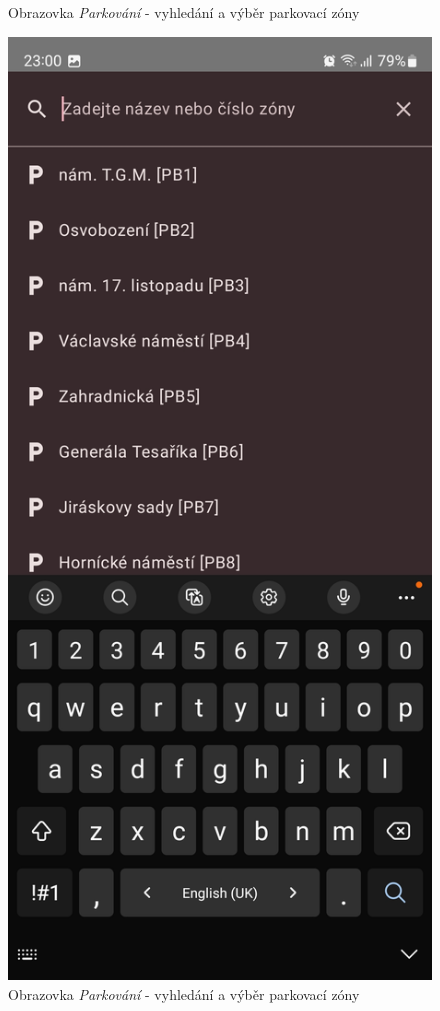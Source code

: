\begin{figure}[H]
  \caption{Obrazovka \textit{Parkování} - vyhledání a výběr parkovací zóny}
\endminipage\hfill
{}
  \includegraphics[width=\linewidth]{screens/3c_B.jpg}
  \caption{Obrazovka \textit{Parkování} - vyhledání a výběr parkovací zóny}
\endminipage\hfill
\end{figure}

